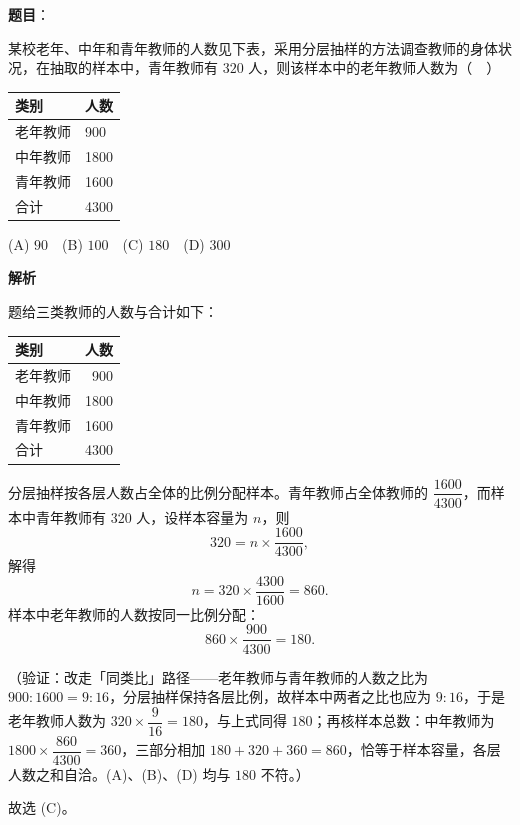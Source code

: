 \begin{answer}

\textbf{题目}：

某校老年、中年和青年教师的人数见下表，采用分层抽样的方法调查教师的身体状况，在抽取的样本中，青年教师有 \(320\) 人，则该样本中的老年教师人数为（　）

\begin{center}
\begin{tabular}{ll}
\toprule
类别 & 人数 \\
\midrule
老年教师 & 900 \\
中年教师 & 1800 \\
青年教师 & 1600 \\
合计 & 4300 \\
\bottomrule
\end{tabular}
\end{center}

(A) \(90\)　(B) \(100\)　(C) \(180\)　(D) \(300\)

\textbf{解析}

题给三类教师的人数与合计如下：

\begin{center}
\begin{tabular}{lr}
\toprule
类别 & 人数 \\
\midrule
老年教师 & 900 \\
中年教师 & 1800 \\
青年教师 & 1600 \\
合计 & 4300 \\
\bottomrule
\end{tabular}
\end{center}

分层抽样按各层人数占全体的比例分配样本。青年教师占全体教师的 \(\dfrac{1600}{4300}\)，而样本中青年教师有 \(320\) 人，设样本容量为 \(n\)，则
\nopagebreak[4]
\[
320=n\times\frac{1600}{4300},
\]
解得
\nopagebreak[4]
\[
n=320\times\frac{4300}{1600}=860.
\]
样本中老年教师的人数按同一比例分配：
\nopagebreak[4]
\[
860\times\frac{900}{4300}=180.
\]

（验证：改走「同类比」路径——老年教师与青年教师的人数之比为 \(900:1600=9:16\)，分层抽样保持各层比例，故样本中两者之比也应为 \(9:16\)，于是老年教师人数为 \(320\times\dfrac{9}{16}=180\)，与上式同得 \(180\)；再核样本总数：中年教师为 \(1800\times\dfrac{860}{4300}=360\)，三部分相加 \(180+320+360=860\)，恰等于样本容量，各层人数之和自洽。(A)、(B)、(D) 均与 \(180\) 不符。）

故选 (C)。


\end{answer}
